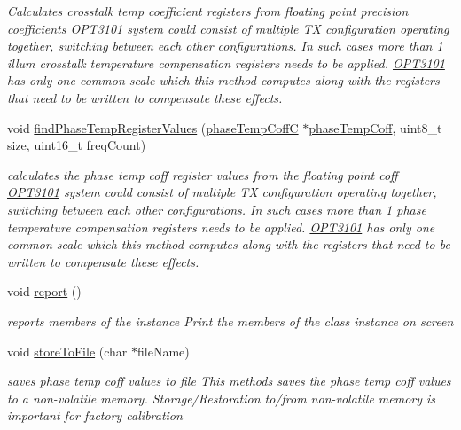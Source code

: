 \begin{DoxyCompactItemize}
\begin{DoxyCompactList}\small\item\em Calculates crosstalk temp coefficient registers from floating point precision coefficients \mbox{\hyperlink{namespace_o_p_t3101}{O\+P\+T3101}} system could consist of multiple TX configuration operating together, switching between each other configurations. In such cases more than 1 illum crosstalk temperature compensation registers needs to be applied. \mbox{\hyperlink{namespace_o_p_t3101}{O\+P\+T3101}} has only one common scale which this method computes along with the registers that need to be written to compensate these effects. \end{DoxyCompactList}\item 
void \mbox{\hyperlink{class_o_p_t3101_1_1calibration_c_a5ca75c8e4d7818a90cacc0471522b365}{find\+Phase\+Temp\+Register\+Values}} (\mbox{\hyperlink{class_o_p_t3101_1_1phase_temp_coff_c}{phase\+Temp\+CoffC}} $\ast$\mbox{\hyperlink{class_o_p_t3101_1_1calibration_c_a277a7bbf506f5f5181719311d10bc610}{phase\+Temp\+Coff}}, uint8\+\_\+t size, uint16\+\_\+t freq\+Count)
\begin{DoxyCompactList}\small\item\em calculates the phase temp coff register values from the floating point coff \mbox{\hyperlink{namespace_o_p_t3101}{O\+P\+T3101}} system could consist of multiple TX configuration operating together, switching between each other configurations. In such cases more than 1 phase temperature compensation registers needs to be applied. \mbox{\hyperlink{namespace_o_p_t3101}{O\+P\+T3101}} has only one common scale which this method computes along with the registers that need to be written to compensate these effects. \end{DoxyCompactList}\item 
void \mbox{\hyperlink{class_o_p_t3101_1_1calibration_c_a092218b4999bced567ec60d147e66caa}{report}} ()
\begin{DoxyCompactList}\small\item\em reports members of the instance Print the members of the class instance on screen \end{DoxyCompactList}\item 
void \mbox{\hyperlink{class_o_p_t3101_1_1calibration_c_a3a8c57f480444c89fc855f7c90d4d81c}{store\+To\+File}} (char $\ast$file\+Name)
\begin{DoxyCompactList}\small\item\em saves phase temp coff values to file This methods saves the phase temp coff values to a non-\/volatile memory. Storage/\+Restoration to/from non-\/volatile memory is important for factory calibration \end{DoxyCompactList}\item 

\end{DoxyCompactItemize}
